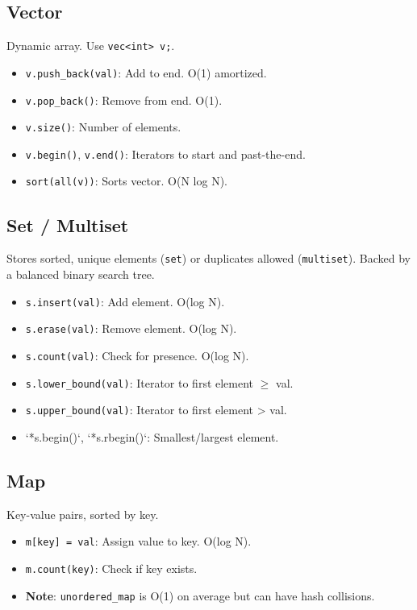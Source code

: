 \documentclass[10pt]{article}
\newcommand{\code}[1]{\texttt{#1}}
\begin{document}
\begin{multicols}{2}
\subsection{Vector}
Dynamic array. Use \code{vec<int> v;}.
\begin{itemize}
    \item \code{v.push_back(val)}: Add to end. O(1) amortized.
    \item \code{v.pop_back()}: Remove from end. O(1).
    \item \code{v.size()}: Number of elements.
    \item \code{v.begin()}, \code{v.end()}: Iterators to start and past-the-end.
    \item \code{sort(all(v))}: Sorts vector. O(N log N).
\end{itemize}

\subsection{Set / Multiset}
Stores sorted, unique elements (\code{set}) or duplicates allowed (\code{multiset}). Backed by a balanced binary search tree.
\begin{itemize}
    \item \code{s.insert(val)}: Add element. O(log N).
    \item \code{s.erase(val)}: Remove element. O(log N).
    \item \code{s.count(val)}: Check for presence. O(log N).
    \item \code{s.lower_bound(val)}: Iterator to first element $\ge$ val.
    \item \code{s.upper_bound(val)}: Iterator to first element > val.
    \item `*s.begin()`, `*s.rbegin()`: Smallest/largest element.
\end{itemize}

\subsection{Map}
Key-value pairs, sorted by key.
\begin{itemize}
    \item \code{m[key] = val}: Assign value to key. O(log N).
    \item \code{m.count(key)}: Check if key exists.
    \item \textbf{Note}: \code{unordered_map} is O(1) on average but can have hash collisions.
\end{itemize}


\end{multicols}
\end{document}
